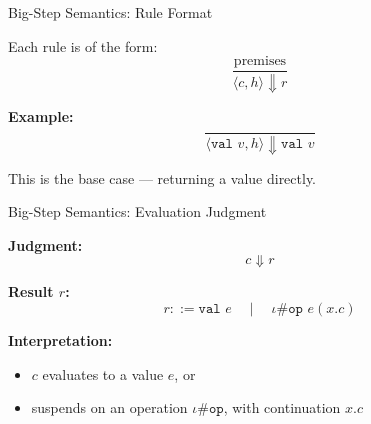 \begin{frame}{Big-Step Semantics: Rule Format}

Each rule is of the form:
\[
\frac{\text{premises}}{\langle c, h \rangle \Downarrow r}
\]

\textbf{Example:}
\[
\frac{}{\langle \texttt{val } v, h \rangle \Downarrow \texttt{val } v}
\]

This is the base case — returning a value directly.
\end{frame}








\begin{frame}{Big-Step Semantics: Evaluation Judgment}

\textbf{Judgment:}
\[
c \Downarrow r
\]

\textbf{Result \(r\):}
\[
r ::= \texttt{val } e \quad \mid \quad \iota \# \texttt{op } e (x. c)
\]

\vspace{1em}
\textbf{Interpretation:}
\begin{itemize}
  \item \(c\) evaluates to a value \(e\), or
  \item suspends on an operation \(\iota \# \texttt{op}\), with continuation \(x.c\)
\end{itemize}
\end{frame}

